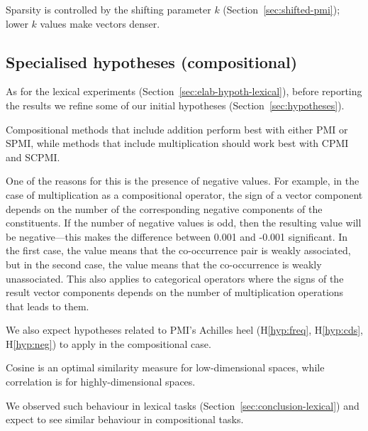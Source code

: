 Sparsity is controlled by the shifting parameter $k$ (Section~\ref{sec:shifted-pmi}); lower $k$ values make vectors denser.

\subsection{Specialised hypotheses (compositional)}
\label{sec:elab-hypoth-comp}

 As for the lexical experiments (Section~\ref{sec:elab-hypoth-lexical}), before reporting the results we refine some of our initial hypotheses (Section~\ref{sec:hypotheses}).

\begin{hyp}
  \label{hyp:comp-pmi-cpmi}
  Compositional methods that include addition perform best with either PMI or SPMI, while methods that include multiplication should work best with CPMI and SCPMI.
\end{hyp}

One of the reasons for this is the presence of negative values. For example, in the case of multiplication as a compositional operator, the sign of a vector component depends on the number of the corresponding negative components of the constituents. If the number of negative values is odd, then the resulting value will be negative---this makes the difference between 0.001 and -0.001 significant. In the first case, the value means that the co-occurrence pair is weakly associated, but in the second case, the value means that the co-occurrence is weakly unassociated. This also applies to categorical operators where the signs of the result vector components depends on the number of multiplication operations that leads to them.

We also expect hypotheses related to PMI's Achilles heel (H\ref{hyp:freq}, H\ref{hyp:cds}, H\ref{hyp:neg}) to apply in the compositional case.

\begin{hyp}
  \label{hyp:similarity}
  Cosine is an optimal similarity measure for low-dimensional spaces, while correlation is for highly-dimensional spaces.
\end{hyp}

We observed such behaviour in lexical tasks (Section~\ref{sec:conclusion-lexical}) and expect to see similar behaviour in compositional tasks.


